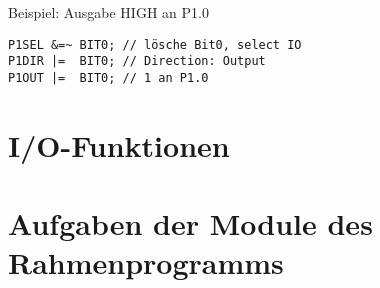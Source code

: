 \documentclass[a4paper, 12pt]{article}
\begin{document}
Beispiel: Ausgabe HIGH an P1.0
\vspace{\parskip}
\begin{lstlisting}
P1SEL &=~ BIT0; // lösche Bit0, select IO 
P1DIR |=  BIT0; // Direction: Output
P1OUT |=  BIT0; // 1 an P1.0
\end{lstlisting}


\section{I/O-Funktionen}

\section{Aufgaben der Module des Rahmenprogramms}

  
 
\end{document}
